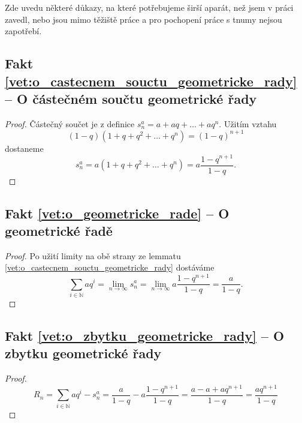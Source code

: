 Zde uvedu některé důkazy, na které potřebujeme širší aparát, než jsem v práci zavedl, nebo jsou mimo těžiště práce a pro pochopení práce s tnumy nejsou zapotřebí.
\subsection{Fakt \ref{vet:o_castecnem_souctu_geometricke_rady} -- O částečném součtu geometrické řady}\label{duk:o_castecnem_souctu_geometricke_rady}
\begin{proof}
Částečný součet je z definice $s^a_n=a+aq+\ldots+aq^n$. Užitím vztahu
\begin{equation}
(1-q)(1+q+q^2+\ldots+q^n)=(1-q)^{n+1}
\end{equation}
dostaneme
\begin{equation}
s^a_n=a(1+q+q^2+\ldots+q^n)=a\frac{1-q^{n+1}}{1-q}.
\end{equation}
\end{proof}

\subsection{Fakt \ref{vet:o_geometricke_rade} -- O geometrické řadě}\label{duk:o_geometricke_rade}
\begin{proof}
Po užití limity na obě strany ze lemmatu \ref{vet:o_castecnem_souctu_geometricke_rady} dostáváme 
\begin{equation}
\sum_{i\in\mathbb{N}}aq^i=\lim_{n\to\infty}s^a_n=\lim_{n\to\infty}a\frac{1-q^{n+1}}{1-q}=\frac{a}{1-q}.
\end{equation}
\end{proof}

\subsection{Fakt \ref{vet:o_zbytku_geometricke_rady} -- O zbytku geometrické řady}\label{duk:o_zbytku_geometricke_rady}	
\begin{proof}
\begin{equation}
R_n = \sum_{i\in\mathbb{N}}aq^i -s^a_n =\frac{a}{1-q} - a\frac{1-q^{n+1}}{1-q} = \frac{a-a+aq^{n+1}}{1-q} = \frac{aq^{n+1}}{1-q}
\end{equation}
\end{proof}

